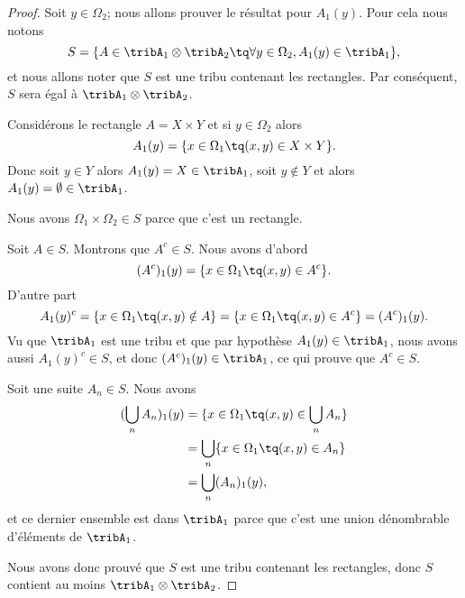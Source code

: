 \begin{proof}
	Soit \( y\in\Omega_2\); nous allons prouver le résultat pour \( A_1(y)\). Pour cela nous notons
	\begin{equation}
		S=\{ A\in \tribA_1\otimes\tribA_2\tq \forall y\in\Omega_2, A_1(y)\in\tribA_1 \},
	\end{equation}
	et nous allons noter que \( S\) est une tribu contenant les rectangles. Par conséquent, \( S\) sera égal à \( \tribA_1\otimes \tribA_2\).

	\begin{subproof}

		Considérons le rectangle \( A=X\times Y\) et si \( y\in \Omega_2\) alors
		\begin{equation}
			A_1(y)=\{ x\in \Omega_1\tq (x,y)\in X\times Y \}.
		\end{equation}
		Donc soit \( y\in Y\) alors \( A_1(y)=X\in\tribA_1\), soit \( y\notin Y\) et alors \( A_1(y)=\emptyset\in\tribA_1\).


		Nous avons \( \Omega_1\times \Omega_2\in S\) parce que c'est un rectangle.

		 Soit \( A\in S\). Montrons que \( A^c\in S\). Nous avons d'abord
		\begin{equation}
			(A^c)_1(y)=\{ x\in \Omega_1\tq (x,y)\in A^c \}.
		\end{equation}
		D'autre part
		\begin{equation}
			A_1(y)^c=\{ x\in\Omega_1\tq (x,y)\notin A \}=\{ x\in \Omega_1\tq (x,y)\in A^c \}=(A^c)_1(y).
		\end{equation}
		Vu que \( \tribA_1\) est une tribu et que par hypothèse \( A_1(y)\in\tribA_1\), nous avons aussi \( A_1(y)^c\in S\), et donc \( (A^c)_1(y)\in \tribA_1\), ce qui prouve que \( A^c\in S\).

		 Soit une suite \( A_n\in S\). Nous avons
		\begin{subequations}
			\begin{align}
				(\bigcup_nA_n)_1(y) & =\{ x\in\Omega_1\tq (x,y)\in \bigcup_nA_n \} \\
				                    & =\bigcup_n\{ x\in\Omega_1\tq (x,y)\in A_n \} \\
				                    & =\bigcup_n(A_n)_1(y),
			\end{align}
		\end{subequations}
		et ce dernier ensemble est dans \( \tribA_1\) parce que c'est une union dénombrable d'éléments de \( \tribA_1\).

	\end{subproof}
	Nous avons donc prouvé que \( S\) est une tribu contenant les rectangles, donc \( S\) contient au moins \( \tribA_1\otimes \tribA_2\).
\end{proof}

